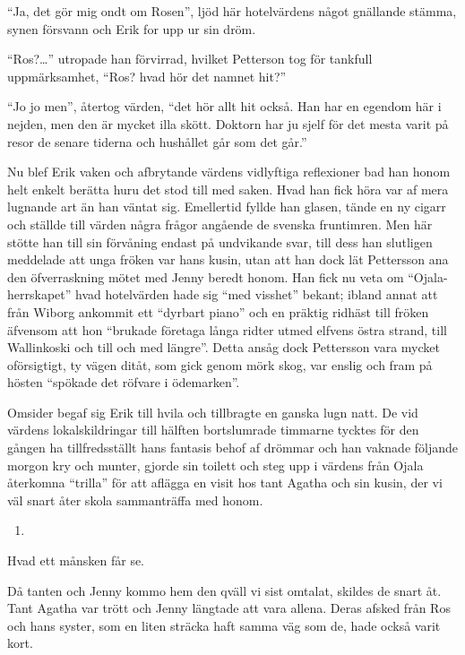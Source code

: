 ``Ja, det gör mig ondt om Rosen'', ljöd här hotelvärdens något gnällande
stämma, synen försvann och Erik for upp ur sin dröm.

``Ros?\ldots{}'' utropade han förvirrad, hvilket Petterson tog för
tankfull uppmärksamhet, ``Ros? hvad hör det namnet hit?''

``Jo jo men'', återtog värden, ``det hör allt hit också. Han har en
egendom här i nejden, men den är mycket illa skött. Doktorn har ju sjelf
för det mesta varit på resor de senare tiderna och hushållet går som det
går.''

Nu blef Erik vaken och afbrytande värdens vidlyftiga reflexioner bad han
honom helt enkelt berätta huru det stod till med saken. Hvad han fick
höra var af mera lugnande art än han väntat sig. Emellertid fyllde han
glasen, tände en ny cigarr och ställde till värden några frågor angående
de svenska fruntimren. Men här stötte han till sin förvåning endast på
undvikande svar, till dess han slutligen meddelade att unga fröken var
hans kusin, utan att han dock lät Pettersson ana den öfverraskning mötet
med Jenny beredt honom. Han fick nu veta om ``Ojala-herrskapet'' hvad
hotelvärden hade sig ``med visshet'' bekant; ibland annat att från
Wiborg ankommit ett ``dyrbart piano'' och en präktig ridhäst till fröken
äfvensom att hon ``brukade företaga långa ridter utmed elfvens östra
strand, till Wallinkoski och till och med längre''. Detta ansåg dock
Pettersson vara mycket oförsigtigt, ty vägen ditåt, som gick genom mörk
skog, var enslig och fram på hösten ``spökade det röfvare i ödemarken''.

Omsider begaf sig Erik till hvila och tillbragte en ganska lugn natt. De
vid värdens lokalskildringar till hälften bortslumrade timmarne tycktes
för den gången ha tillfredsställt hans fantasis behof af drömmar och han
vaknade följande morgon kry och munter, gjorde sin toilett och steg upp
i värdens från Ojala återkomna ``trilla'' för att aflägga en visit hos
tant Agatha och sin kusin, der vi väl snart åter skola sammanträffa med
honom.

\begin{enumerate}
\def\labelenumi{\arabic{enumi}.}
\setcounter{enumi}{14}
\tightlist
\item
\end{enumerate}

Hvad ett månsken får se.

Då tanten och Jenny kommo hem den qväll vi sist omtalat, skildes de
snart åt. Tant Agatha var trött och Jenny längtade att vara allena.
Deras afsked från Ros och hans syster, som en liten sträcka haft samma
väg som de, hade också varit kort.

